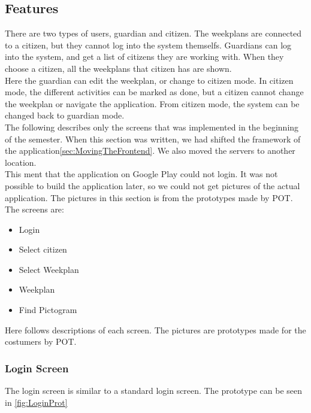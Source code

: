 \subsection{Features}
There are two types of users, guardian and citizen. The weekplans are connected to a citizen, but they cannot log into the system themselfs. Guardians can log into the system, and get a list of citizens they are working with. When they choose a citizen, all the weekplans that citizen has are shown.\\
Here the guardian can edit the weekplan, or change to citizen mode. In citizen mode, the different activities can be marked as done, but a citizen cannot change the weekplan or navigate the application. From citizen mode, the system can be changed back to guardian mode.\\
The following describes only the screens that was implemented in the beginning of the semester. When this section was written, we had shifted the framework of the application\ref{sec:MovingTheFrontend}. We also moved the servers to another location.\\
This ment that the application on Google Play could not login. It was not possible to build the application later, so we could not get pictures of the actual application. The pictures in this section is from the prototypes made by \gls{POT}.\\ 

The screens are:
\begin{itemize}
    \item Login
    \item Select citizen 
    \item Select Weekplan 
    \item Weekplan
    \item Find Pictogram
\end{itemize}

Here follows descriptions of each screen. The pictures are prototypes made for the costumers by \gls{POT}. 

\subsubsection*{Login Screen}
The login screen is similar to a standard login screen. The prototype can be seen in \ref{fig:LoginProt}

